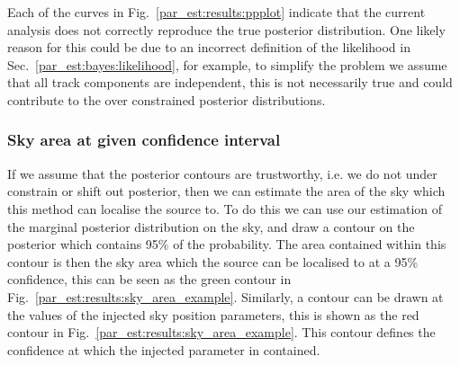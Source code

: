 Each of the curves in Fig.~\ref{par_est:results:ppplot} indicate that the
current analysis does not correctly reproduce the true posterior distribution.
One likely reason for this could be due to an incorrect definition of the likelihood in Sec.~\ref{par_est:bayes:likelihood}, for example, to simplify the problem we assume
that all track components are independent, this is not necessarily true and
could contribute to the over constrained posterior
distributions.

%
%
\subsubsection{\label{par_est:results:simulations:skyarea}Sky area at given confidence interval}
%
%

If we assume that the posterior contours are trustworthy, i.e. we do not under constrain or
shift out posterior, then we can estimate the area of the sky which this method can
localise the source to.  To do this we can use our estimation of the marginal
posterior distribution on the sky, and draw a contour on the posterior which
contains 95\% of the probability.  The area contained within this contour is
then the sky area which the source can be localised to at a 95\% confidence,
this can be seen as the green contour in
Fig.~\ref{par_est:results:sky_area_example}.  Similarly, a contour can be drawn
at the values of the injected sky position parameters, this is shown as the red contour in
Fig.~\ref{par_est:results:sky_area_example}. 
This contour defines the confidence at which the injected parameter in contained.

